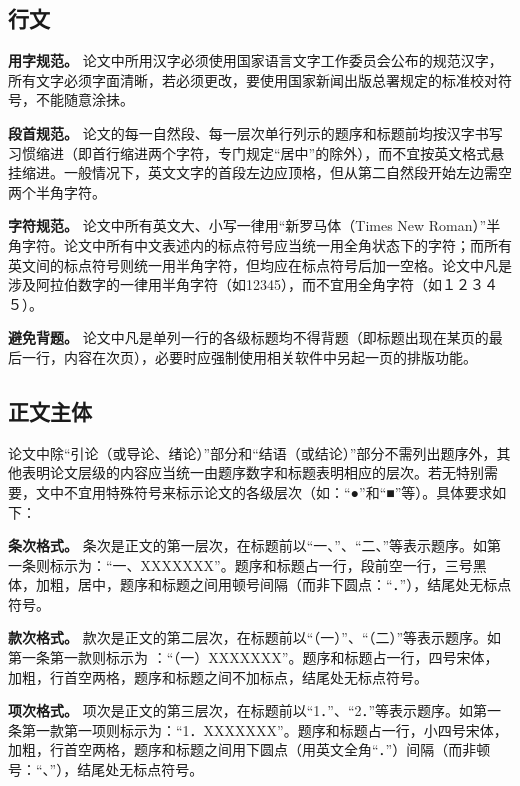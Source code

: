 \documentclass[doublesided]{Style/ucasthesis}%
\begin{document}
\hypertarget{section-26}{%
\subsection{行文}\label{section-26}}

\textbf{用字规范。} 论文中所用汉字必须使用国家语言文字工作委员会公布的规范汉字，所有文字必须字面清晰，若必须更改，要使用国家新闻出版总署规定的标准校对符号，不能随意涂抺。

\textbf{段首规范。} 论文的每一自然段、每一层次单行列示的题序和标题前均按汉字书写习惯缩进（即首行缩进两个字符，专门规定``居中''的除外），而不宜按英文格式悬挂缩进。一般情况下，英文文字的首段左边应顶格，但从第二自然段开始左边需空两个半角字符。

\textbf{字符规范。} 论文中所有英文大、小写一律用``新罗马体（Times New Roman）''半角字符。论文中所有中文表述内的标点符号应当统一用全角状态下的字符；而所有英文间的标点符号则统一用半角字符，但均应在标点符号后加一空格。论文中凡是涉及阿拉伯数字的一律用半角字符（如12345），而不宜用全角字符（如１２３４５）。

\textbf{避免背题。} 论文中凡是单列一行的各级标题均不得背题（即标题出现在某页的最后一行，内容在次页），必要时应强制使用相关软件中另起一页的排版功能。

\hypertarget{section-27}{%
\subsection{正文主体}\label{section-27}}

论文中除``引论（或导论、绪论）''部分和``结语（或结论）''部分不需列出题序外，其他表明论文层级的内容应当统一由题序数字和标题表明相应的层次。若无特别需要，文中不宜用特殊符号来标示论文的各级层次（如：``●''和``■''等）。具体要求如下：

\textbf{条次格式。} 条次是正文的第一层次，在标题前以``一、''、``二、''等表示题序。如第一条则标示为：``一、XXXXXXX''。题序和标题占一行，段前空一行，三号黑体，加粗，居中，题序和标题之间用顿号间隔（而非下圆点：``．''），结尾处无标点符号。

\textbf{款次格式。} 款次是正文的第二层次，在标题前以``（一）''、``（二）''等表示题序。如第一条第一款则标示为 ：``（一）XXXXXXX''。题序和标题占一行，四号宋体，加粗，行首空两格，题序和标题之间不加标点，结尾处无标点符号。

\textbf{项次格式。} 项次是正文的第三层次，在标题前以``1．''、``2．''等表示题序。如第一条第一款第一项则标示为：``1．XXXXXXX''。题序和标题占一行，小四号宋体，加粗，行首空两格，题序和标题之间用下圆点（用英文全角``．''）间隔（而非顿号：``、''），结尾处无标点符号。
\end{document}
